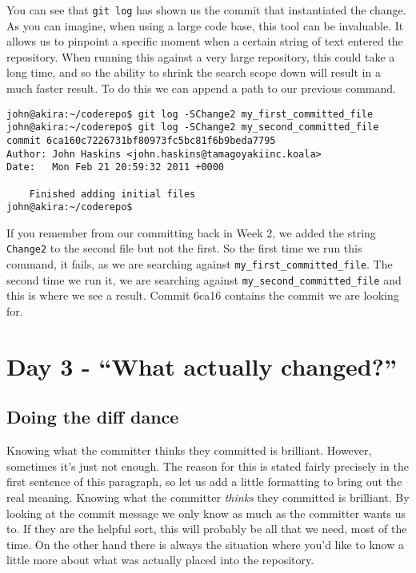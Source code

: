 You can see that \texttt{git log} has shown us the commit that instantiated the change.  As you can imagine, when using a large code base, this tool can be invaluable.  It allows us to pinpoint a specific moment when a certain string of text entered the repository.  When running this against a very large repository, this could take a long time, and so the ability to shrink the search scope down will result in a much faster result.  To do this we can append a path to our previous command.  

\begin{Verbatim}[frame=leftline,framerule=1mm,fontsize=\relsize{-3}] 
john@akira:~/coderepo$ git log -SChange2 my_first_committed_file
john@akira:~/coderepo$ git log -SChange2 my_second_committed_file
commit 6ca160c7226731bf80973fc5bc81f6b9beda7795
Author: John Haskins <john.haskins@tamagoyakiinc.koala>
Date:   Mon Feb 21 20:59:32 2011 +0000

    Finished adding initial files
john@akira:~/coderepo$ 
\end{Verbatim}

If you remember from our committing back in Week 2, we added the string \texttt{Change2} to the second file but not the first.  So the first time we run this command, it fails, as we are searching against \texttt{my\_first\_committed\_file}.  The second time we run it, we are searching against \texttt{my\_second\_committed\_file} and this is where we see a result.  Commit 6ca16 contains the commit we are looking for.

\section{Day 3 - ``What actually changed?''}
\subsection{Doing the diff dance}

Knowing what the committer thinks they committed is brilliant.  However, sometimes it's just not enough.  The reason for this is stated fairly precisely in the first sentence of this paragraph, so let us add a little formatting to bring out the real meaning.  Knowing what the committer \emph{thinks} they committed is brilliant.  By looking at the commit message we only know as much as the committer wants us to.  If they are the helpful sort, this will probably be all that we need, most of the time.  On the other hand there is always the situation where you'd like to know a little more about what was actually placed into the repository.

